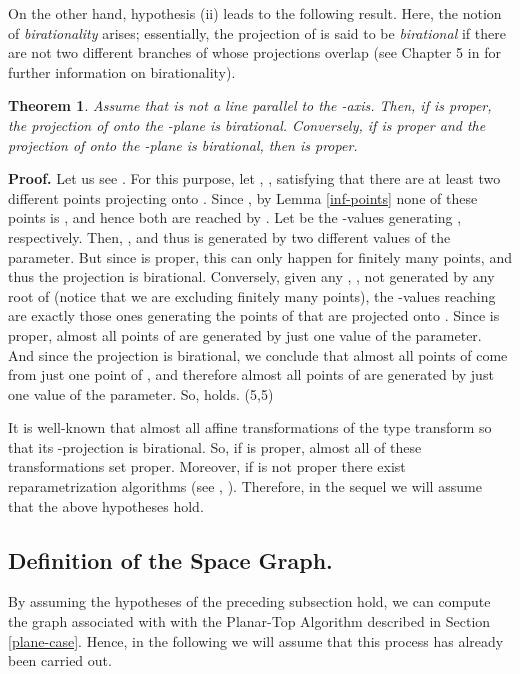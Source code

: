 \documentclass{elsart}
\def\qed{\hfill  \framebox(5,5){}}
\newtheorem{theorem}{{\bf Theorem}}
\begin{document}
On the other hand, hypothesis (ii) leads to the following result. Here, the notion of {\it birationality} arises; essentially, the projection of  is said to be {\it birational} if there are not two different branches of  whose projections overlap (see Chapter 5 in \cite{cox-1} for further information on birationality).





\begin{theorem} \label{lem-third-hyp}
Assume that  is not a line parallel to the -axis. Then, if  is proper, the projection of  onto the -plane is birational. Conversely, if  is proper and the projection of  onto the -plane is birational, then  is proper.
\end{theorem}

{\bf Proof.} Let us see . For this purpose, let , , satisfying that there are at least two different points  projecting onto . Since , by Lemma \ref{inf-points} none of these points is , and hence both are reached by . Let  be the -values generating , respectively. Then, , and thus  is generated by two different values of the parameter. But since  is proper, this can only happen for finitely many points, and thus the projection is birational. Conversely, given any , , not generated by any root of  (notice that we are excluding finitely many points), the -values reaching  are exactly those ones generating the points of  that are projected onto . Since  is proper, almost all points of  are generated by just one value of the parameter. And since the projection is birational, we conclude that almost all points of  come from just one point of , and therefore almost all points of  are generated by just one value of the parameter. So,  holds. \qed

It is well-known that almost all affine transformations of the
type  transform 
so that its -projection is birational. So,
if  is proper, almost all of these transformations set
 proper. Moreover, if  is not proper
there exist reparametrization algorithms (see \cite{Tomas},
\cite{Seder}). Therefore, in the sequel we will assume that the
above hypotheses hold.

\subsection{Definition of the Space Graph.}\label{graph-3d}

By assuming the hypotheses of the preceding subsection hold, we
can compute the graph  associated with
 with the Planar-Top Algorithm described
in Section \ref{plane-case}. Hence, in the following we will
assume that this process has already been carried out.
\end{document}
